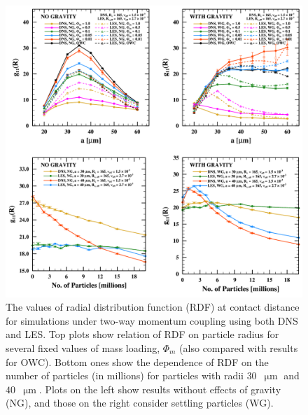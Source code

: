 \documentclass{pracamgren}
\begin{document}
\begin{figure}[h]
\centering
\includegraphics[width=13.5cm]{figures/2-08_twcrdf.pdf}
\caption{
The values of radial distribution function (RDF) at contact distance for simulations under two-way momentum coupling using both DNS and LES.
Top plots show relation of RDF on particle radius for several fixed values of mass loading, $\Phi_m$ (also compared with results for OWC).
Bottom ones show the dependence of RDF on the number of particles (in millions) for particles with radii $30$~$\upmu\text{m}$ and $40$~$\upmu\text{m}$.
Plots on the left show results without effects of gravity (NG), and those on the right consider settling particles (WG).
}
\label{fig:twcrdf}
\end{figure}
\end{document}
